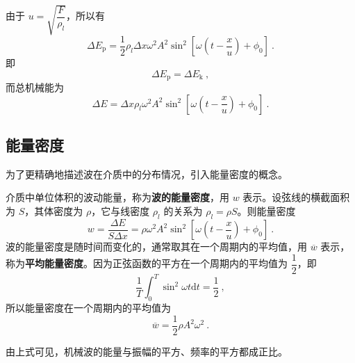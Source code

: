 由于 $u=\sqrt{\dfrac{F}{\rho_{l}}}$，所以有
\begin{equation}
\Delta E_{\mathrm{p}}=\frac{1}{2} \rho_{l} \Delta x \omega^{2} A^{2} \sin ^{2}\left[\omega\left(t-\frac{x}{u}\right)+\phi_{0}\right]~.
\end{equation}
即
\begin{equation}
\Delta E_{\mathrm{p}}=\Delta E_{\mathrm{k}}~,
\end{equation}
而总机械能为
\begin{equation}
\Delta E=\Delta x \rho_{l} \omega^{2} A^{2} \sin ^{2}\left[\omega\left(t-\frac{x}{u}\right)+\phi_{0}\right]~.
\end{equation}

\subsection{能量密度}

为了更精确地描述波在介质中的分布情况，引入能量密度的概念。

介质中单位体积的波动能量，称为\textbf{波的能量密度}，用 $w$ 表示。设弦线的横截面积为 $S$，其体密度为 $\rho$，它与线密度 $\rho_l$ 的关系为 $\rho_l=\rho S$。则能量密度
\begin{equation}
w=\frac{\Delta E}{S \Delta x}=\rho \omega^{2} A^{2} \sin ^{2}\left[\omega\left(t-\frac{x}{u}\right)+\phi_{0}\right]~.
\end{equation}
波的能量密度是随时间而变化的，通常取其在一个周期内的平均值，用 $\overline w$ 表示，称为\textbf{平均能量密度}。因为正弦函数的平方在一个周期内的平均值为 $\dfrac 12$，即
\begin{equation}
\frac{1}{T} \int_{0}^{T} \sin ^{2} \omega t \mathrm{d} t=\frac{1}{2}~,
\end{equation}
所以能量密度在一个周期内的平均值为
\begin{equation}
\overline{w}=\frac{1}{2} \rho A^{2} \omega^{2}~.
\end{equation}

由上式可见，机械波的能量与振幅的平方、频率的平方都成正比。